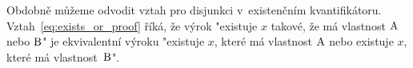 
Obdobně můžeme odvodit vztah pro disjunkci v~existenčním kvantifikátoru. Vztah~\eqref{eq:exists_or_proof} říká, že výrok "existuje \(x\) takové, že má vlastnost \(\mathrm{A}\) nebo \(\mathrm{B}\)" je ekvivalentní výroku "existuje \(x\), které má vlastnost \(\mathrm{A}\) nebo existuje \(x\), které má vlastnost~\(\mathrm{B}\)".


\begin{fact}
\end{fact}
